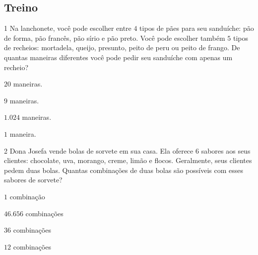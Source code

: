 {{{{\begin{escolha}
{\section*{Treino}

\num{1}  Na lanchonete, você pode escolher entre $4$ tipos de pães para seu
sanduíche: pão de forma, pão francês, pão sírio e pão preto. Você pode
escolher também $5$ tipos de recheios: mortadela, queijo, presunto, peito
de peru ou peito de frango. De quantas maneiras diferentes você pode
pedir seu sanduíche com apenas um recheio?

\begin{escolha}
\item $20$ maneiras.
\item $9$ maneiras.
\item $1.024$ maneiras.
\item $1$ maneira.
\end{escolha}



\num{2}  Dona Josefa vende bolas de sorvete em sua casa. Ela oferece $6$ sabores
aos seus clientes: chocolate, uva, morango, creme, limão e flocos.
Geralmente, seus clientes pedem duas bolas. Quantas combinações de duas
bolas são possíveis com esses sabores de sorvete?

\begin{escolha}
\item $1$ combinação
\item $46.656$ combinações
\item $36$ combinações
\item $12$ combinações
\end{escolha}

}
\end{escolha}}}}}
